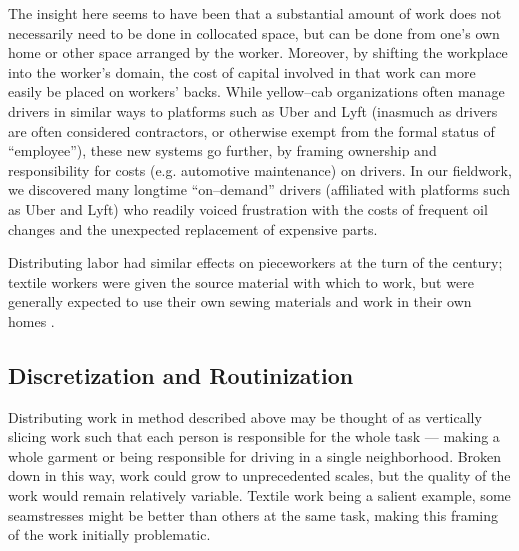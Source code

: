\documentclass{sigchi}
\begin{document}
The insight here seems to have been that
a substantial amount of work does not necessarily need to be done in collocated space,
but can be done from one's own home or other space arranged by the worker.
Moreover, by shifting the workplace into the worker's domain,
the cost of capital involved in that work can more easily be placed on workers' backs.
While yellow--cab organizations often manage drivers in similar ways to platforms such as Uber and Lyft
(inasmuch as drivers are often considered contractors, or otherwise exempt from the formal status of ``employee''),
these new systems go further,
by framing ownership and responsibility for costs
(e.g. automotive maintenance)
on drivers.
In our fieldwork, we discovered many longtime ``on--demand'' drivers
(affiliated with platforms such as Uber and Lyft)
who readily voiced frustration with the costs of
frequent oil changes and the unexpected replacement of expensive parts.

Distributing labor had similar effects on pieceworkers at the turn of the  century;
textile workers were given the source material with which to work,
but were generally expected to use their own sewing materials and work in their own homes
\cite{hapke2004sweatshop}.








\subsection{Discretization and Routinization}

Distributing work in method described above may be thought of as vertically slicing work such that 
each person is responsible for the whole task
--- making a whole garment or being responsible for driving in a single neighborhood.
Broken down in this way, work could grow to unprecedented scales,
but the quality of the work would remain relatively variable.
Textile work being a salient example,
some seamstresses might be better than others at the same task,
making this framing of the work initially problematic.
\end{document}
